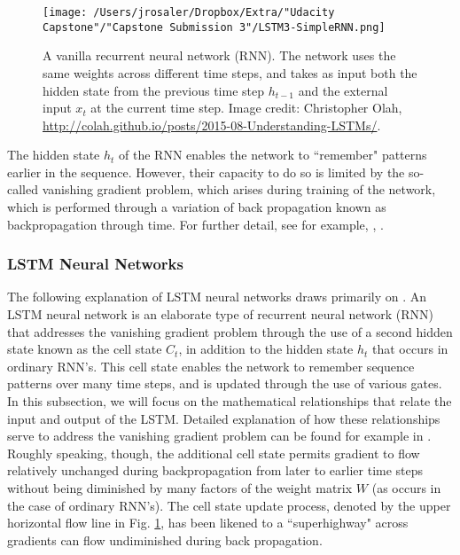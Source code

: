 \documentclass{article}
\begin{document}
\begin{figure}[]
\texttt{[image: /Users/jrosaler/Dropbox/Extra/"Udacity Capstone"/"Capstone Submission 3"/LSTM3-SimpleRNN.png]}
\caption{A vanilla recurrent neural network (RNN). The network uses the same weights across different time steps, and takes as input both the hidden state from the previous time step $h_{t-1}$ and the external input $x_{t}$ at the current time step. Image credit: Christopher Olah, \url{http://colah.github.io/posts/2015-08-Understanding-LSTMs/}. }
\label{LSTMChain}
\end{figure}

The hidden state $h_{t}$ of the RNN enables the network to ``remember" patterns earlier in the sequence. However, their capacity to do so is limited by the so-called vanishing gradient problem, which arises during training of the network, which is performed through a variation of back propagation known as backpropagation through time. For further detail, see for example, \cite{olah2015understanding}, \cite{goodfellow2016deep}.





\subsubsection{LSTM Neural Networks}

The following explanation of LSTM neural networks draws primarily on \cite{olah2015understanding}. An LSTM neural network is an elaborate type of recurrent neural network (RNN) that addresses the vanishing gradient problem through the use of a second hidden state known as the cell state $C_{t}$, in addition to the hidden state $h_{t}$ that occurs in ordinary RNN's. This cell state enables the network to remember sequence patterns over many time steps, and is updated through the use of various gates. In this subsection, we will focus on the mathematical relationships that relate the input and output of the LSTM. Detailed explanation of how these relationships serve to address the vanishing gradient problem can be found for example in  \cite{goodfellow2016deep}. Roughly speaking, though, the additional cell state permits gradient to flow relatively unchanged during backpropagation from later to earlier time steps without being diminished by many factors of the weight matrix $W$ (as occurs in the case of ordinary RNN's). The cell state update process, denoted by the upper horizontal flow line in Fig. \ref{LSTMChain}, has been likened to a ``superhighway" across gradients can flow undiminished during back propagation.  
\end{document}
